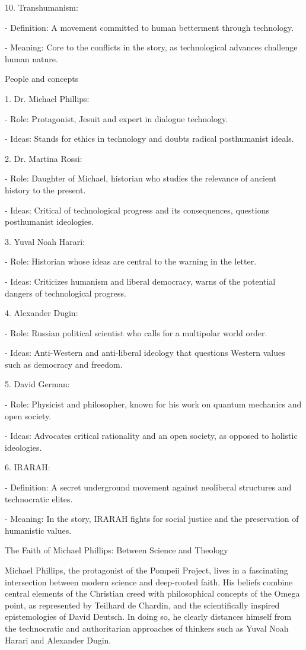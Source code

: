 \documentclass[
]{article}
\begin{document}
10. Transhumanism:

- Definition: A movement committed to human betterment through
technology.

- Meaning: Core to the conflicts in the story, as technological advances
challenge human nature.

People and concepts

1. Dr. Michael Phillips:

- Role: Protagonist, Jesuit and expert in dialogue technology.

- Ideas: Stands for ethics in technology and doubts radical posthumanist
ideals.

2. Dr. Martina Rossi:

- Role: Daughter of Michael, historian who studies the relevance of
ancient history to the present.

- Ideas: Critical of technological progress and its consequences,
questions posthumanist ideologies.

3. Yuval Noah Harari:

- Role: Historian whose ideas are central to the warning in the letter.

- Ideas: Criticizes humanism and liberal democracy, warns of the
potential dangers of technological progress.

4. Alexander Dugin:

- Role: Russian political scientist who calls for a multipolar world
order.

- Ideas: Anti-Western and anti-liberal ideology that questions Western
values \hspace{0pt}\hspace{0pt}such as democracy and freedom.

5. David German:

- Role: Physicist and philosopher, known for his work on quantum
mechanics and open society.

- Ideas: Advocates critical rationality and an open society, as opposed
to holistic ideologies.

6. IRARAH:

- Definition: A secret underground movement against neoliberal
structures and technocratic elites.

- Meaning: In the story, IRARAH fights for social justice and the
preservation of humanistic values.

The Faith of Michael Phillips: Between Science and Theology

Michael Phillips, the protagonist of the Pompeii Project, lives in a
fascinating intersection between modern science and deep-rooted faith.
His beliefs combine central elements of the Christian creed with
philosophical concepts of the Omega point, as represented by Teilhard de
Chardin, and the scientifically inspired epistemologies of David
Deutsch. In doing so, he clearly distances himself from the technocratic
and authoritarian approaches of thinkers such as Yuval Noah Harari and
Alexander Dugin.
\end{document}
